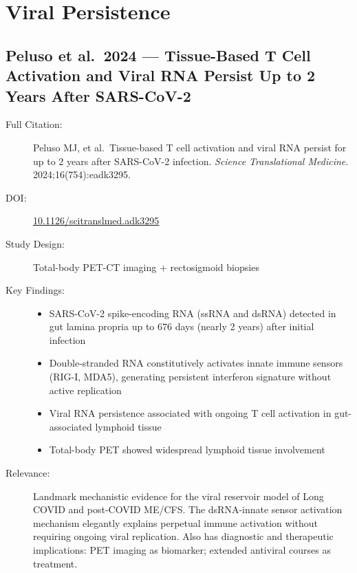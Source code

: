 \section{Viral Persistence}
\label{sec:bib-viral-persistence-2026}

\subsection{Peluso et al.\ 2024 --- Tissue-Based T Cell Activation and Viral RNA Persist Up to 2 Years After SARS-CoV-2}

\begin{description}
    \item[Full Citation:] Peluso MJ, et al.\ Tissue-based T cell activation and viral RNA persist for up to 2 years after SARS-CoV-2 infection. \textit{Science Translational Medicine}. 2024;16(754):eadk3295. \cite{Peluso2024ViralPersistence}
    \item[DOI:] \href{https://doi.org/10.1126/scitranslmed.adk3295}{10.1126/scitranslmed.adk3295}
    \item[Study Design:] Total-body PET-CT imaging $+$ rectosigmoid biopsies
    \item[Key Findings:]
    \begin{itemize}
        \item SARS-CoV-2 spike-encoding RNA (ssRNA and dsRNA) detected in gut lamina propria up to 676 days (nearly 2 years) after initial infection
        \item Double-stranded RNA constitutively activates innate immune sensors (RIG-I, MDA5), generating persistent interferon signature without active replication
        \item Viral RNA persistence associated with ongoing T cell activation in gut-associated lymphoid tissue
        \item Total-body PET showed widespread lymphoid tissue involvement
    \end{itemize}
    \item[Relevance:] Landmark mechanistic evidence for the viral reservoir model of Long COVID and post-COVID ME/CFS. The dsRNA-innate sensor activation mechanism elegantly explains perpetual immune activation without requiring ongoing viral replication. Also has diagnostic and therapeutic implications: PET imaging as biomarker; extended antiviral courses as treatment.

\end{description}
